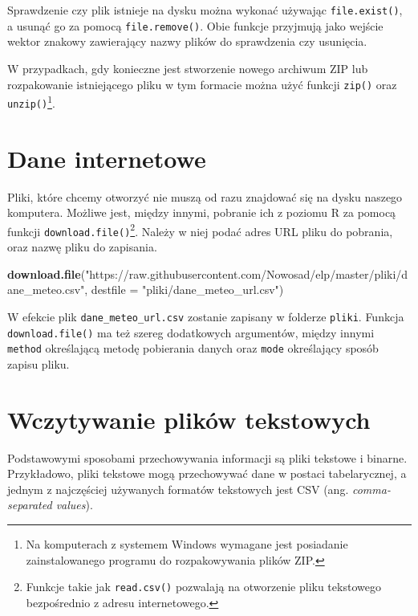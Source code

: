 \documentclass[paper=6in:9in,pagesize=pdftex,headinclude=on,footinclude=on,10pt]{scrbook}
\newenvironment{Shaded}{\begin{snugshade}}{\end{snugshade}}
\newcommand{\DataTypeTok}[1]{\textcolor[rgb]{0.13,0.29,0.53}{#1}}
\newcommand{\KeywordTok}[1]{\textcolor[rgb]{0.13,0.29,0.53}{\textbf{#1}}}
\newcommand{\NormalTok}[1]{#1}
\newcommand{\StringTok}[1]{\textcolor[rgb]{0.31,0.60,0.02}{#1}}
\begin{document}
Sprawdzenie czy plik istnieje na dysku można wykonać używając \texttt{file.exist()}, a usunąć go za pomocą \texttt{file.remove()}.
Obie funkcje przyjmują jako wejście wektor znakowy zawierający nazwy plików do sprawdzenia czy usunięcia.

W przypadkach, gdy konieczne jest stworzenie nowego archiwum ZIP lub rozpakowanie istniejącego pliku w tym formacie można użyć funkcji \texttt{zip()} oraz \texttt{unzip()}\footnote{Na komputerach z systemem Windows wymagane jest posiadanie zainstalowanego programu do rozpakowywania plików ZIP.}.

\hypertarget{dane-internetowe}{%
\section{Dane internetowe}\label{dane-internetowe}}

Pliki, które chcemy otworzyć nie muszą od razu znajdować się na dysku naszego komputera.
Możliwe jest, między innymi, pobranie ich z poziomu R za pomocą funkcji \texttt{download.file()}\footnote{Funkcje takie jak \texttt{read.csv()} pozwalają na otworzenie pliku tekstowego bezpośrednio z adresu internetowego.}.
Należy w niej podać adres URL pliku do pobrania, oraz nazwę pliku do zapisania.

\begin{Shaded}
\begin{Highlighting}[]
\KeywordTok{download.file}\NormalTok{(}\StringTok{"https://raw.githubusercontent.com/Nowosad/elp/master/pliki/dane_meteo.csv"}\NormalTok{, }
              \DataTypeTok{destfile =} \StringTok{"pliki/dane_meteo_url.csv"}\NormalTok{)}
\end{Highlighting}
\end{Shaded}

W efekcie plik \texttt{dane\_meteo\_url.csv} zostanie zapisany w folderze \texttt{pliki}.
Funkcja \texttt{download.file()} ma też szereg dodatkowych argumentów, między innymi \texttt{method} określającą metodę pobierania danych oraz \texttt{mode} określający sposób zapisu pliku.

\hypertarget{wczytywanie-plikuxf3w-tekstowych}{%
\section{Wczytywanie plików tekstowych}\label{wczytywanie-plikuxf3w-tekstowych}}

Podstawowymi sposobami przechowywania informacji są pliki tekstowe i binarne.
Przykładowo, pliki tekstowe mogą przechowywać dane w postaci tabelarycznej, a jednym z najczęściej używanych formatów tekstowych jest CSV (ang. \emph{comma-separated values}).
\end{document}

